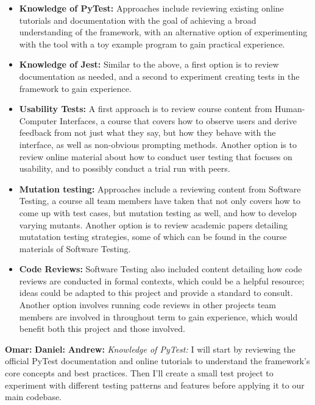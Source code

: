 \documentclass[12pt, titlepage]{article}
\begin{document}
\begin{enumerate}
  \begin{itemize}
    \item \textbf{Knowledge of PyTest:} Approaches include reviewing existing online tutorials and documentation with the goal of achieving a
    broad understanding of the framework, with an alternative option of experimenting with the tool with a toy example program to gain practical experience.
    \item \textbf{Knowledge of Jest:} Similar to the above, a first option is to review documentation as needed, and a second to experiment creating tests
    in the framework to gain experience.
    \item \textbf{Usability Tests:} A first approach is to review course content from Human-Computer Interfaces, a course that covers how to 
    observe users and derive feedback from not just what they say, but how they behave with the interface, as well as non-obvious prompting methods.
    Another option is to review online material about how to conduct user testing that focuses on usability, and to possibly conduct a trial run 
    with peers.
    \item \textbf{Mutation testing:} Approaches include a reviewing content from Software Testing, a course all team members have taken that not only 
    covers how to come up with test cases, but mutation testing as well, and how to develop varying mutants. Another option is to review 
    academic papers detailing mutatation testing strategies, some of which can be found in the course materials of Software Testing.
    \item \textbf{Code Reviews:} Software Testing also included content detailing how code reviews are conducted in formal contexts, which could be 
    a helpful resource; ideas could be adapted to this project and provide a standard to consult. Another option involves running code reviews in other 
    projects team members are involved in throughout term to gain experience, which would benefit both this project and those involved.
  \end{itemize}

  \textbf{Omar: }
  \newline
  \textbf{Daniel: }
  \newline
  \textbf{Andrew: }
  \textit{Knowledge of PyTest:} I will start by reviewing the official PyTest documentation and online tutorials to understand the framework's core concepts and best practices. Then I'll create a small test project to experiment with different testing patterns and features before applying it to our main codebase.
  

\end{enumerate}
\end{document}
